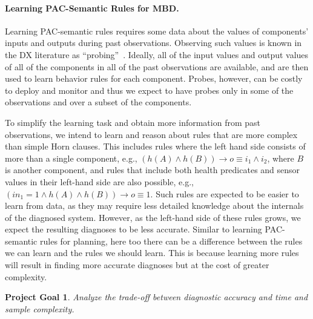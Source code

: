 \documentclass[12pt]{article}
\newtheorem{problem}{Project Goal}
\begin{document}
\paragraph{Learning PAC-Semantic Rules for MBD.}
Learning PAC-semantic rules requires some data about the values of components' inputs and outputs during past observations. Observing such values is known in the DX literature as ``probing''~\cite{deKleer1987diagnosing,rish2004real,feldman2010model}. 
Ideally, all of the input values and output values of all of the components in all of the past observations are available, 
and are then used to learn behavior rules for each component. 
Probes, however, can be costly to deploy and monitor and thus we expect to have probes only in some of the observations and over a subset of the components. 

To simplify the learning task and obtain more information from past observations, we intend to learn and reason about rules that are more complex than simple Horn clauses. This includes rules where the left hand side consists  of more than a single component,  e.g., $(h(A)\wedge h(B)) \rightarrow o\equiv i_1\wedge i_2$, where $B$ is another component, 
and rules that include both health predicates and sensor values in their left-hand side are also possible, e.g., 
$(in_1=1 \wedge h(A) \wedge h(B))\rightarrow o\equiv 1$. Such rules are expected to be easier to learn from data, as they may require less detailed knowledge about the internals of the diagnosed system. 
However, as the left-hand side of these rules grows, we expect the resulting diagnoses to be less accurate. 
Similar to learning PAC-semantic rules for planning, here too there can be a difference between the rules we can learn and the rules we should learn. This is because learning more rules will result in finding more accurate diagnoses but at the cost of greater complexity. 
\begin{problem}
Analyze the trade-off between diagnostic accuracy and time and sample complexity. 
\end{problem}
\end{document}

